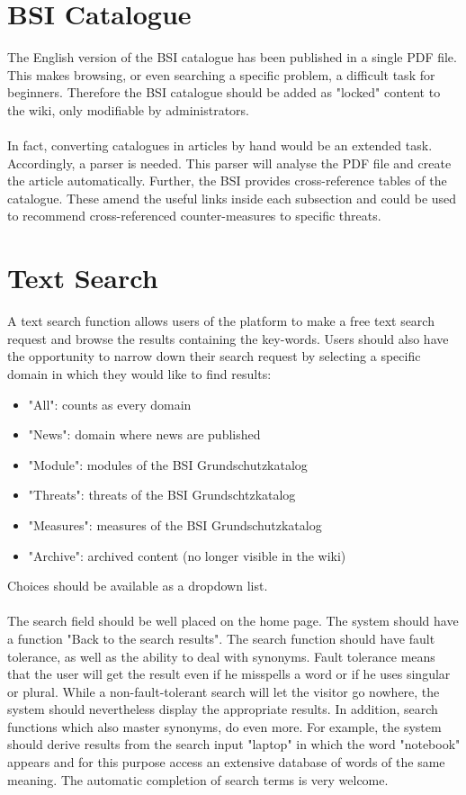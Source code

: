 \section{BSI Catalogue}
The English version of the BSI catalogue has been published in a single PDF file. 
This makes browsing, or even searching a specific problem, a difficult task for beginners. 
Therefore the BSI catalogue should be added as "locked" content to the wiki, only modifiable by administrators.
\\\\
In fact, converting catalogues in articles by hand would be an extended task. 
Accordingly, a parser is needed. 
This parser will analyse the PDF file and create the article automatically. 
Further, the BSI provides cross-reference tables of the catalogue. 
These amend the useful links inside each subsection and could be used to recommend cross-referenced counter-measures to specific threats.


\section{Text Search}
\label{search_function}
A text search function allows users of the platform to make a free text search request and browse the results containing the key-words. 
Users should also have the opportunity to narrow down their search request by selecting a specific domain  in which they would like to find results:
\begin{itemize}
\item "All": counts as every domain
\item "News": domain where news are published
\item "Module": modules of the BSI Grundschutzkatalog
\item "Threats": threats of the BSI Grundschtzkatalog
\item "Measures": measures of the BSI Grundschutzkatalog
\item "Archive": archived content (no longer visible in the wiki)
\end{itemize}
Choices should be available as a dropdown list.
\\\\
The search field should be well placed on the home page. 
The system should have a function "Back to the search results". 
The search function should have fault tolerance, as well as the ability to deal with synonyms. 
Fault tolerance means that the user will get the result even if he misspells a word or if he uses singular or plural. 
While a non-fault-tolerant search will let the visitor go nowhere, the system should nevertheless display the appropriate results.
In addition, search functions which also master synonyms, do even more. 
For example, the system should derive results from the search input "laptop" in which the word "notebook" appears and for this purpose access an extensive database of words of the same meaning. 
The automatic completion of search terms is very welcome.
 
